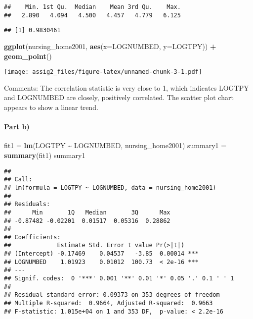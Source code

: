 \documentclass[
]{article}
\newenvironment{Shaded}{\begin{snugshade}}{\end{snugshade}}
\newcommand{\AttributeTok}[1]{\textcolor[rgb]{0.13,0.29,0.53}{#1}}
\newcommand{\CommentTok}[1]{\textcolor[rgb]{0.56,0.35,0.01}{\textit{#1}}}
\newcommand{\FunctionTok}[1]{\textcolor[rgb]{0.13,0.29,0.53}{\textbf{#1}}}
\newcommand{\NormalTok}[1]{#1}
\newcommand{\OtherTok}[1]{\textcolor[rgb]{0.56,0.35,0.01}{#1}}
\newcommand{\SpecialCharTok}[1]{\textcolor[rgb]{0.81,0.36,0.00}{\textbf{#1}}}
\begin{document}
\begin{verbatim}
##    Min. 1st Qu.  Median    Mean 3rd Qu.    Max. 
##   2.890   4.094   4.500   4.457   4.779   6.125
\end{verbatim}

\begin{Shaded}
\end{Shaded}

\begin{verbatim}
## [1] 0.9830461
\end{verbatim}

\begin{Shaded}
\begin{Highlighting}[]
\FunctionTok{ggplot}\NormalTok{(nursing\_home2001, }\FunctionTok{aes}\NormalTok{(}\AttributeTok{x=}\NormalTok{LOGNUMBED, }\AttributeTok{y=}\NormalTok{LOGTPY)) }\SpecialCharTok{+}
  \FunctionTok{geom\_point}\NormalTok{()}
\end{Highlighting}
\end{Shaded}

\texttt{[image: assig2\_files/figure-latex/unnamed-chunk-3-1.pdf]}

\n Comments: The correlation statistic is very close to 1, which
indicates LOGTPY and LOGNUMBED are closely, positively correlated. The
scatter plot chart appears to show a linear trend.

\hypertarget{part-b}{%
\paragraph{Part b)}\label{part-b}}

\begin{Shaded}
\begin{Highlighting}[]
\NormalTok{fit1 }\OtherTok{=} \FunctionTok{lm}\NormalTok{(LOGTPY }\SpecialCharTok{\textasciitilde{}}\NormalTok{ LOGNUMBED, nursing\_home2001)}
\NormalTok{summary1 }\OtherTok{=} \FunctionTok{summary}\NormalTok{(fit1)}
\NormalTok{summary1}
\end{Highlighting}
\end{Shaded}

\begin{verbatim}
## 
## Call:
## lm(formula = LOGTPY ~ LOGNUMBED, data = nursing_home2001)
## 
## Residuals:
##      Min       1Q   Median       3Q      Max 
## -0.87482 -0.02201  0.01517  0.05316  0.28862 
## 
## Coefficients:
##             Estimate Std. Error t value Pr(>|t|)    
## (Intercept) -0.17469    0.04537   -3.85  0.00014 ***
## LOGNUMBED    1.01923    0.01012  100.73  < 2e-16 ***
## ---
## Signif. codes:  0 '***' 0.001 '**' 0.01 '*' 0.05 '.' 0.1 ' ' 1
## 
## Residual standard error: 0.09373 on 353 degrees of freedom
## Multiple R-squared:  0.9664, Adjusted R-squared:  0.9663 
## F-statistic: 1.015e+04 on 1 and 353 DF,  p-value: < 2.2e-16
\end{verbatim}
\end{document}

